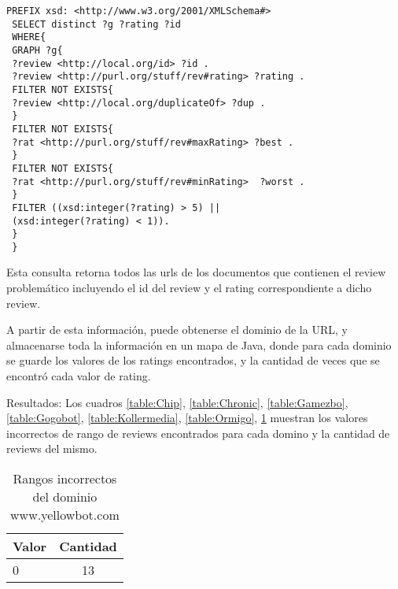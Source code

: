 \begin{lstlisting}[frame=single]
 PREFIX xsd: <http://www.w3.org/2001/XMLSchema#> 
 SELECT distinct ?g ?rating ?id 
 WHERE{
 GRAPH ?g{
 ?review <http://local.org/id> ?id .
 ?review <http://purl.org/stuff/rev#rating> ?rating .
 FILTER NOT EXISTS{
 ?review <http://local.org/duplicateOf> ?dup .
 }
 FILTER NOT EXISTS{
 ?rat <http://purl.org/stuff/rev#maxRating> ?best .
 }
 FILTER NOT EXISTS{
 ?rat <http://purl.org/stuff/rev#minRating>  ?worst .
 }
 FILTER ((xsd:integer(?rating) > 5) ||
 (xsd:integer(?rating) < 1)).
 }
 }
\end{lstlisting}

Esta consulta retorna todos las urls de los documentos que contienen el review problemático incluyendo el id del review y el 
rating correspondiente a dicho review.

A partir de esta información, puede obtenerse el dominio de la URL, y almacenarse toda la información en un mapa de Java, donde para cada dominio se 
guarde los valores de los ratings encontrados, y la cantidad de veces que se encontró cada valor de rating.

Resultados:
Los cuadros \ref{table:Chip}, \ref{table:Chronic}, \ref{table:Gamezbo}, \ref{table:Gogobot}, \ref{table:Kollermedia}, \ref{table:Ormigo}, \ref{table:YellowBot} muestran 
los valores incorrectos de rango de reviews encontrados para cada domino y la cantidad de reviews del mismo.

\begin{table}[h]
\begin{tabular}{| l | c |}\hline
 Valor & Cantidad\\\hline
 0 & 13\\\hline
\end{tabular}
\caption{Rangos incorrectos del dominio www.yellowbot.com}
\label{table:YellowBot}
\end{table}

